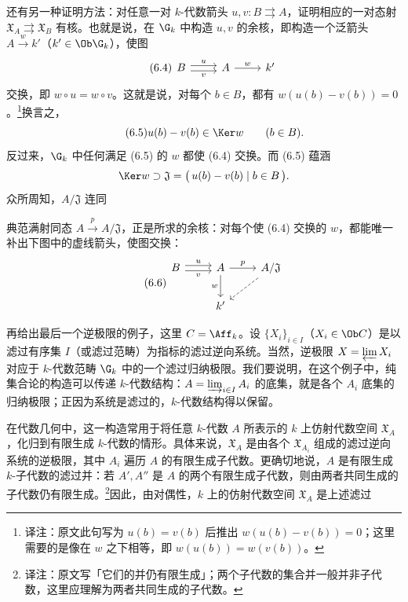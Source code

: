 还有另一种证明方法：对任意一对 $k$-代数箭头 $u,v:B\rightrightarrows A$，证明相应的一对态射 $\mathfrak X_A\rightrightarrows\mathfrak X_B$ 有核。也就是说，在 $\G_k$ 中构造 $u,v$ 的余核，即构造一个泛箭头 $A\xrightarrow w k'$（$k'\in\Ob\G_k$），使图
\begin{equation}\tag{6.4}
\begin{tikzcd}[ampersand replacement=\&]
B\arrow[r,shift left,"u"]\arrow[r,shift right,"v"']\&A\arrow[r,"w"]\&k'
\end{tikzcd}
\end{equation}
交换，即 $w\circ u=w\circ v$。这就是说，对每个 $b\in B$，都有 $w(u(b)-v(b))=0$。\footnote{译注：原文此句写为 $u(b)=v(b)$ 后推出 $w(u(b)-v(b))=0$；这里需要的是像在 $w$ 之下相等，即 $w(u(b))=w(v(b))$。}换言之，
\begin{equation}\tag{6.5}
u(b)-v(b)\in\Ker w\qquad(b\in B).
\end{equation}
反过来，$\G_k$ 中任何满足 (6.5) 的 $w$ 都使 (6.4) 交换。而 (6.5) 蕴涵
\[
\Ker w\supset\mathfrak J
=\bigl(\,u(b)-v(b)\mid b\in B\,\bigr).
\]
众所周知，$A/\mathfrak J$ 连同

典范满射同态 $A\xrightarrow p A/\mathfrak J$，正是所求的余核：对每个使 (6.4) 交换的 $w$，都能唯一补出下图中的虚线箭头，使图交换：
\begin{equation}\tag{6.6}
\begin{tikzcd}[ampersand replacement=\&]
B\arrow[r,shift left,"u"]\arrow[r,shift right,"v"']\&A\arrow[r,"p"]\arrow[d,"w"']\&A/\mathfrak J\arrow[dl,dashed]\\
\&k'\&
\end{tikzcd}
\end{equation}

再给出最后一个逆极限的例子，这里 $C=\Aff_k$。设 $\{X_i\}_{i\in I}$（$X_i\in\Ob C$）是以滤过有序集 $I$（或滤过范畴）为指标的滤过逆向系统。当然，逆极限 $X=\varprojlim X_i$ 对应于 $k$-代数范畴 $\G_k$ 中的一个滤过归纳极限。我们要说明，在这个例子中，纯集合论的构造可以传递 $k$-代数结构：$A=\varinjlim_{i\in I}A_i$ 的底集，就是各个 $A_i$ 底集的归纳极限；正因为系统是滤过的，$k$-代数结构得以保留。

在代数几何中，这一构造常用于将任意 $k$-代数 $A$ 所表示的 $k$ 上仿射代数空间 $\mathfrak X_A$，化归到有限生成 $k$-代数的情形。具体来说，$\mathfrak X_A$ 是由各个 $\mathfrak X_{A_i}$ 组成的滤过逆向系统的逆极限，其中 $A_i$ 遍历 $A$ 的有限生成子代数。更确切地说，$A$ 是有限生成 $k$-子代数的滤过并：若 $A',A''$ 是 $A$ 的两个有限生成子代数，则由两者共同生成的子代数仍有限生成。\footnote{译注：原文写「它们的并仍有限生成」；两个子代数的集合并一般并非子代数，这里应理解为两者共同生成的子代数。}因此，由对偶性，$k$ 上的仿射代数空间 $\mathfrak X_A$ 是上述滤过


